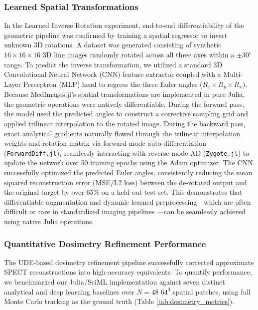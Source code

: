 \documentclass[10pt,letterpaper]{article}
\begin{document}
\subsubsection*{Learned Spatial Transformations}
In the Learned Inverse Rotation experiment, end-to-end differentiability of the geometric pipeline was confirmed by training a spatial regressor to invert unknown 3D rotations. A dataset was generated consisting of synthetic $16 \times 16 \times 16$ 3D line images randomly rotated across all three axes within a $\pm 30^{\circ}$ range. To predict the inverse transformation, we utilized a standard 3D Convolutional Neural Network (CNN) feature extractor coupled with a Multi-Layer Perceptron (MLP) head to regress the three Euler angles ($R_z \times R_y \times R_x$). Because MedImages.jl's spatial transformations are implemented in pure Julia, the geometric operations were natively differentiable. During the forward pass, the model used the predicted angles to construct a corrective sampling grid and applied trilinear interpolation to the rotated image. During the backward pass, exact analytical gradients naturally flowed through the trilinear interpolation weights and rotation matrix via forward-mode auto-differentiation (\texttt{ForwardDiff.jl}), seamlessly interacting with reverse-mode AD (\texttt{Zygote.jl}) to update the network over 50 training epochs using the Adam optimizer. The CNN successfully optimized the predicted Euler angles, consistently reducing the mean squared reconstruction error (MSE/L2 loss) between the de-rotated output and the original target by over 65\% on a held-out test set. This demonstrates that differentiable augmentation and dynamic learned preprocessing---which are often difficult or rare in standardized imaging pipelines \cite{Shi_2023}---can be seamlessly achieved using native Julia operations.

\subsubsection*{Quantitative Dosimetry Refinement Performance}
The UDE-based dosimetry refinement pipeline successfully corrected approximate SPECT reconstructions into high-accuracy equivalents. To quantify performance, we benchmarked our Julia/SciML implementation against seven distinct analytical and deep learning baselines over $N=48$ $64^3$ spatial patches, using full Monte Carlo tracking as the ground truth (Table \ref{tab:dosimetry_metrics}).
\end{document}
